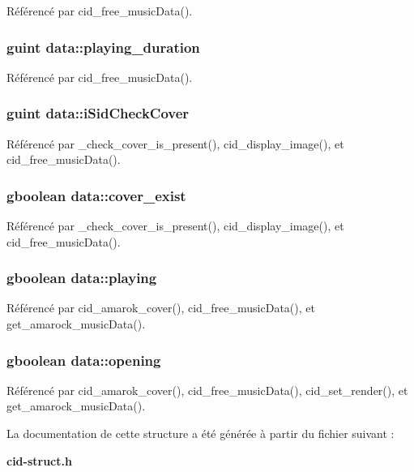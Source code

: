 Référencé par cid\_\-free\_\-musicData().
\subsubsection{\setlength{\rightskip}{0pt plus 5cm}guint {\bf data::playing\_\-duration}}\label{structdata_bd4213f17a129a8cfa81aae4b499b82e}




Référencé par cid\_\-free\_\-musicData().
\subsubsection{\setlength{\rightskip}{0pt plus 5cm}guint {\bf data::iSidCheckCover}}\label{structdata_bc7d89eeb185b84f9c5da26d13a0342a}




Référencé par \_\-check\_\-cover\_\-is\_\-present(), cid\_\-display\_\-image(), et cid\_\-free\_\-musicData().
\subsubsection{\setlength{\rightskip}{0pt plus 5cm}gboolean {\bf data::cover\_\-exist}}\label{structdata_c5eb3006a687d3bc6ff93c237c97f81f}




Référencé par \_\-check\_\-cover\_\-is\_\-present(), cid\_\-display\_\-image(), et cid\_\-free\_\-musicData().
\subsubsection{\setlength{\rightskip}{0pt plus 5cm}gboolean {\bf data::playing}}\label{structdata_1d129eddc7a533f259e504f944e0ce78}




Référencé par cid\_\-amarok\_\-cover(), cid\_\-free\_\-musicData(), et get\_\-amarock\_\-musicData().
\subsubsection{\setlength{\rightskip}{0pt plus 5cm}gboolean {\bf data::opening}}\label{structdata_4f0d5ec86c215b53f903924b86b430c8}




Référencé par cid\_\-amarok\_\-cover(), cid\_\-free\_\-musicData(), cid\_\-set\_\-render(), et get\_\-amarock\_\-musicData().

La documentation de cette structure a été générée à partir du fichier suivant :\begin{CompactItemize}
\item 
{\bf cid-struct.h}\end{CompactItemize}
